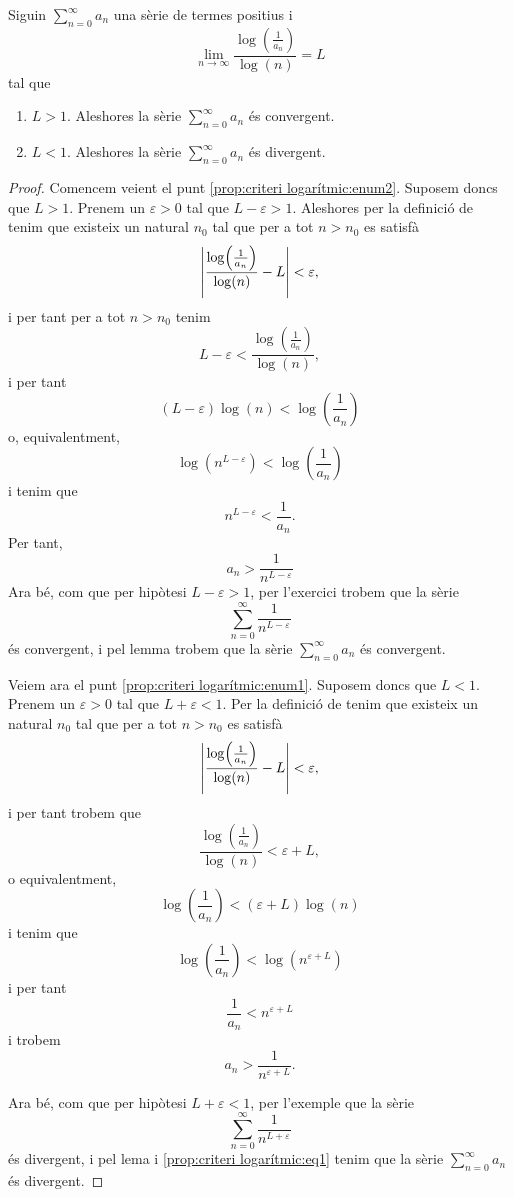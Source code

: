 \documentclass[../../Main.tex]{subfiles}
\begin{document}
	\begin{proposition}
		\label{prop:criteri logarítmic}
		Siguin \(\sum_{n=0}^{\infty}a_{n}\) una sèrie de termes positius i
		\[\lim_{n\to\infty}\frac{\log\left(\frac{1}{a_{n}}\right)}{\log(n)}=L\]
		tal que
		\begin{enumerate}
			\item\label{prop:criteri logarítmic:enum1} \(L>1\). Aleshores la sèrie \(\sum_{n=0}^{\infty}a_{n}\) és convergent.
			\item\label{prop:criteri logarítmic:enum2} \(L<1\). Aleshores la sèrie \(\sum_{n=0}^{\infty}a_{n}\) és divergent.
		\end{enumerate}
		\begin{proof}
			Comencem veient el punt \eqref{prop:criteri logarítmic:enum2}. Suposem doncs que \(L>1\). Prenem un \(\varepsilon>0\) tal que \(L-\varepsilon>1\). Aleshores per la definició de  tenim que existeix un natural \(n_{0}\) tal que per a tot \(n>n_{0}\) es satisfà
			\[\abs{\frac{\log\left(\frac{1}{a_{n}}\right)}{\log(n)}-L}<\varepsilon,\]
			i per tant per a tot \(n>n_{0}\) tenim
			\[L-\varepsilon<\frac{\log\left(\frac{1}{a_{n}}\right)}{\log(n)},\]
			i per tant
			\[(L-\varepsilon)\log(n)<\log\left(\frac{1}{a_{n}}\right)\]
			o, equivalentment,
			\[\log\left(n^{L-\varepsilon}\right)<\log\left(\frac{1}{a_{n}}\right)\]
			i tenim que %
			\[n^{L-\varepsilon}<\frac{1}{a_{n}}.\]
			Per tant,
			\[a_{n}>\frac{1}{n^{L-\varepsilon}}\]
			Ara bé, com que per hipòtesi \(L-\varepsilon>1\), per l'exercici  trobem que la sèrie
			\[\sum_{n=0}^{\infty}\frac{1}{n^{L-\varepsilon}}\]
			és convergent, i pel lemma  trobem que la sèrie \(\sum_{n=0}^{\infty}a_{n}\) és convergent.
			
			Veiem ara el punt \eqref{prop:criteri logarítmic:enum1}. Suposem doncs que \(L<1\). Prenem un \(\varepsilon>0\) tal que \(L+\varepsilon<1\). Per la definició de  tenim que existeix un natural \(n_{0}\) tal que per a tot \(n>n_{0}\) es satisfà
			\[\abs{\frac{\log\left(\frac{1}{a_{n}}\right)}{\log(n)}-L}<\varepsilon,\]
			i per tant trobem que
			\[\frac{\log\left(\frac{1}{a_{n}}\right)}{\log(n)}<\varepsilon+L,\]
			o equivalentment,
			\[\log\left(\frac{1}{a_{n}}\right)<(\varepsilon+L)\log(n)\]
			i tenim que
			\[\log\left(\frac{1}{a_{n}}\right)<\log\left(n^{\varepsilon+L}\right)\]
			i per tant
			\[\frac{1}{a_{n}}<n^{\varepsilon+L}\]
			i trobem
			\begin{equation}
				\label{prop:criteri logarítmic:eq1}
				a_{n}>\frac{1}{n^{\varepsilon+L}}.
			\end{equation}
			
			Ara bé, com que per hipòtesi \(L+\varepsilon<1\), per l'exemple  que la sèrie
			\[\sum_{n=0}^{\infty}\frac{1}{n^{L+\varepsilon}}\]
			és divergent, i pel lema  i \eqref{prop:criteri logarítmic:eq1} tenim que la sèrie \(\sum_{n=0}^{\infty}a_{n}\) és divergent.
		\end{proof}
	\end{proposition}
\end{document}
